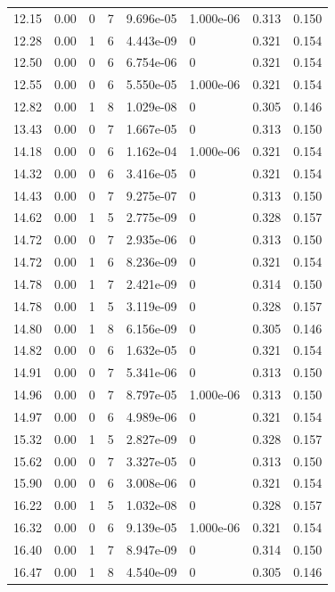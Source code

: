 \documentclass[preview]{standalone}
\begin{document}
{{{\begin{tabular}{L{1.2cm}C{1.2cm} C{0.3cm}C{0.5cm} C{1.4cm}C{1.4cm} C{1.4cm}C{1.4cm}}
  12.15  &  0.00  & 0     &  7 &  9.696e-05  & 1.000e-06  & 0.313 &  0.150   \\ 
  12.28  &  0.00  & 1     &  6 &  4.443e-09  & 0  & 0.321 &  0.154   \\ 
  12.50  &  0.00  & 0     &  6 &  6.754e-06  & 0  & 0.321 &  0.154   \\ 
  12.55  &  0.00  & 0     &  6 &  5.550e-05  & 1.000e-06  & 0.321 &  0.154   \\ 
  12.82  &  0.00  & 1     &  8 &  1.029e-08  & 0  & 0.305 &  0.146   \\ 
  13.43  &  0.00  & 0     &  7 &  1.667e-05  & 0  & 0.313 &  0.150   \\ 
  14.18  &  0.00  & 0     &  6 &  1.162e-04  & 1.000e-06  & 0.321 &  0.154   \\ 
  14.32  &  0.00  & 0     &  6 &  3.416e-05  & 0  & 0.321 &  0.154   \\ 
  14.43  &  0.00  & 0     &  7 &  9.275e-07  & 0  & 0.313 &  0.150   \\ 
  14.62  &  0.00  & 1     &  5 &  2.775e-09  & 0  & 0.328 &  0.157   \\ 
  14.72  &  0.00  & 0     &  7 &  2.935e-06  & 0  & 0.313 &  0.150   \\ 
  14.72  &  0.00  & 1     &  6 &  8.236e-09  & 0  & 0.321 &  0.154   \\ 
  14.78  &  0.00  & 1     &  7 &  2.421e-09  & 0  & 0.314 &  0.150   \\ 
  14.78  &  0.00  & 1     &  5 &  3.119e-09  & 0  & 0.328 &  0.157   \\ 
  14.80  &  0.00  & 1     &  8 &  6.156e-09  & 0  & 0.305 &  0.146   \\ 
  14.82  &  0.00  & 0     &  6 &  1.632e-05  & 0  & 0.321 &  0.154   \\ 
  14.91  &  0.00  & 0     &  7 &  5.341e-06  & 0  & 0.313 &  0.150   \\ 
  14.96  &  0.00  & 0     &  7 &  8.797e-05  & 1.000e-06  & 0.313 &  0.150   \\ 
  14.97  &  0.00  & 0     &  6 &  4.989e-06  & 0  & 0.321 &  0.154   \\ 
  15.32  &  0.00  & 1     &  5 &  2.827e-09  & 0  & 0.328 &  0.157   \\ 
  15.62  &  0.00  & 0     &  7 &  3.327e-05  & 0  & 0.313 &  0.150   \\ 
  15.90  &  0.00  & 0     &  6 &  3.008e-06  & 0  & 0.321 &  0.154   \\ 
  16.22  &  0.00  & 1     &  5 &  1.032e-08  & 0  & 0.328 &  0.157   \\ 
  16.32  &  0.00  & 0     &  6 &  9.139e-05  & 1.000e-06  & 0.321 &  0.154   \\ 
  16.40  &  0.00  & 1     &  7 &  8.947e-09  & 0  & 0.314 &  0.150   \\ 
  16.47  &  0.00  & 1     &  8 &  4.540e-09  & 0  & 0.305 &  0.146   \\ 
\hline 
\end{tabular} 

}}}
\end{document}
